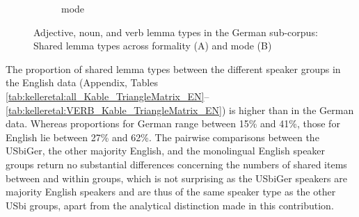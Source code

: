 \documentclass[output=paper,colorlinks,citecolor=brown]{langscibook}
\begin{document}
\begin{figure}[hp]
\begin{subfigure}{\textwidth}
    \caption{mode}
    \end{subfigure}
    \caption{Adjective, noun, and verb lemma types in the German sub-corpus: Shared lemma types across formality (A) and mode (B)}
    \label{fig:kelleretal:arrangedformalityDE}
\end{figure}

The proportion of shared lemma types between the different speaker groups in the English data (Appendix, Tables \ref{tab:kelleretal:all_Kable_TriangleMatrix_EN}--\ref{tab:kelleretal:VERB_Kable_TriangleMatrix_EN}) is higher than in the German data. Whereas proportions for German range between 15\% and 41\%, those for English lie between 27\% and 62\%. The pairwise comparisons between the USbiGer, the other majority English, and the monolingual English speaker groups return no substantial differences concerning the numbers of shared items between and within groups, which is not surprising as the USbiGer speakers are majority English speakers and are thus of the same speaker type as the other USbi groups, apart from the analytical distinction made in this contribution.
\largerpage
\end{document}
